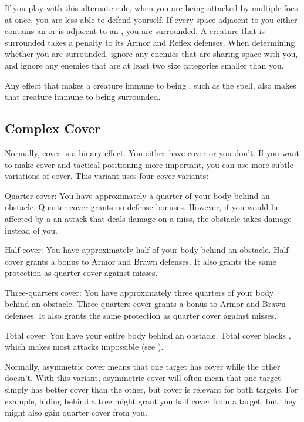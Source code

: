     If you play with this alternate rule, when you are being attacked by multiple foes at once, you are less able to defend yourself.
    If every space adjacent to you either contains an  or is adjacent to an , you are surrounded.
    A creature that is surrounded takes a  penalty to its Armor and Reflex defenses.
    When determining whether you are surrounded, ignore any enemies that are sharing space with you, and ignore any enemies that are at least two size categories smaller than you.

    Any effect that makes a creature immune to being \partiallyunaware, such as the  spell, also makes that creature immune to being surrounded.

  \subsection{Complex Cover}
    Normally, cover is a binary effect.
    You either have cover or you don't.
    If you want to make cover and tactical positioning more important, you can use more subtle variations of cover.
    This variant uses four cover variants:
    \begin{raggeditemize}
      \item Quarter cover: You have approximately a quarter of your body behind an obstacle.
        Quarter cover grants no defense bonuses.
        However, if you would be affected by a an attack that deals damage on a miss, the obstacle takes damage instead of you.
      \item Half cover: You have approximately half of your body behind an obstacle.
        Half cover grants a  bonus to Armor and Brawn defenses.
        It also grants the same protection as quarter cover against misses.
      \item Three-quarters cover: You have approximately three quarters of your body behind an obstacle.
        Three-quarters cover grants a  bonus to Armor and Brawn defenses.
        It also grants the same protection as quarter cover against misses.
      \item Total cover: You have your entire body behind an obstacle.
        Total cover blocks , which makes most attacks impossible (see ).
    \end{raggeditemize}

    Normally, asymmetric cover means that one target has cover while the other doesn't.
    With this variant, asymmetric cover will often mean that one target simply has better cover than the other, but cover is relevant for both targets.
    For example, hiding behind a tree might grant you half cover from a target, but they might also gain quarter cover from you.

